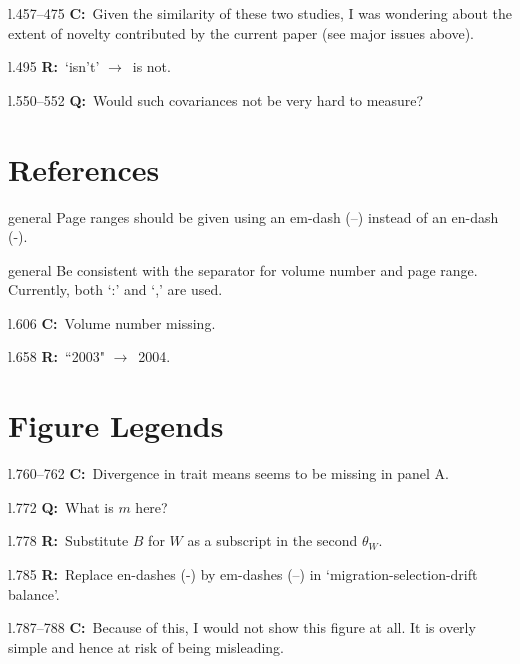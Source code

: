 \documentclass[11pt]{article}
\newenvironment{my_description}
{\begin{description}
  \setlength{\itemsep}{2pt}
  \setlength{\parskip}{0pt}
  \setlength{\parsep}{0pt}}
{\end{description}}
\newcommand{\ra}{$\rightarrow$\ }
\newcommand{\C}{\textbf{C:}\ }
\newcommand{\Q}{\textbf{Q:}\ }
\newcommand{\R}{\textbf{R:}\ }
\begin{document}
\begin{my_description}
	\item[l.457--475] \C Given the similarity of these two studies, I was wondering about the extent of novelty contributed by the current paper (see major issues above).
	\item[l.495] \R `isn't' \ra is not.
	\item[l.550--552] \Q Would such covariances not be very hard to measure?
\end{my_description}
	
\section{References}
\begin{my_description}
	\item[general] Page ranges should be given using an em-dash (--) instead of an en-dash (-).
	\item[general] Be consistent with the separator for volume number and page range. Currently, both `:' and `,' are used.
	\item[l.606] \C Volume number missing.
	\item[l.658] \R ``2003" \ra 2004.
\end{my_description}


\section{Figure Legends}
\begin{my_description}
	\item[l.760--762] \C Divergence in trait means seems to be missing in panel A.
	\item[l.772] \Q What is $m$ here?
	\item[l.778] \R Substitute $B$ for $W$ as a subscript in the second $\theta_W$.
	\item[l.785] \R Replace en-dashes (-) by em-dashes (--) in `migration-selection-drift balance'.
	\item[l.787--788] \C Because of this, I would not show this figure at all. It is overly simple and hence at risk of being misleading.
\end{my_description}
\end{document}
